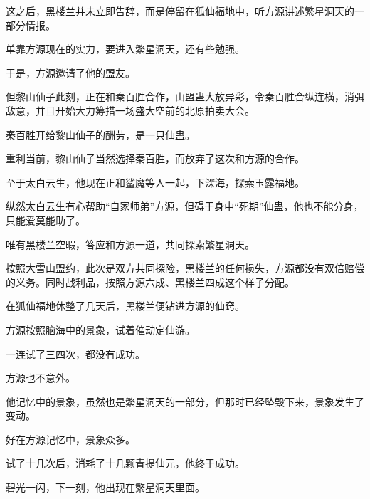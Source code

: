 \begin{this_body}
这之后，黑楼兰并未立即告辞，而是停留在狐仙福地中，听方源讲述繁星洞天的一部分情报。

单靠方源现在的实力，要进入繁星洞天，还有些勉强。

于是，方源邀请了他的盟友。

但黎山仙子此刻，正在和秦百胜合作，山盟蛊大放异彩，令秦百胜合纵连横，消弭敌意，并且开始大力筹措一场盛大空前的北原拍卖大会。

秦百胜开给黎山仙子的酬劳，是一只仙蛊。

重利当前，黎山仙子当然选择秦百胜，而放弃了这次和方源的合作。

至于太白云生，他现在正和鲨魔等人一起，下深海，探索玉露福地。

纵然太白云生有心帮助“自家师弟”方源，但碍于身中“死期”仙蛊，他也不能分身，只能爱莫能助了。

唯有黑楼兰空暇，答应和方源一道，共同探索繁星洞天。

按照大雪山盟约，此次是双方共同探险，黑楼兰的任何损失，方源都没有双倍赔偿的义务。同时战利品，按照方源六成、黑楼兰四成这个样子分配。

在狐仙福地休整了几天后，黑楼兰便钻进方源的仙窍。

方源按照脑海中的景象，试着催动定仙游。

一连试了三四次，都没有成功。

方源也不意外。

他记忆中的景象，虽然也是繁星洞天的一部分，但那时已经坠毁下来，景象发生了变动。

好在方源记忆中，景象众多。

试了十几次后，消耗了十几颗青提仙元，他终于成功。

碧光一闪，下一刻，他出现在繁星洞天里面。

\end{this_body}

